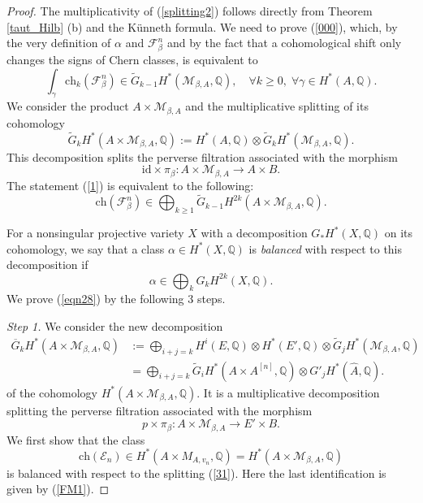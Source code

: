 \documentclass[11pt]{amsart}
\newcommand{\cb}{\color{blue}}
\theoremstyle{plain}
\theoremstyle{definition}
\theoremstyle{remark}
\newcommand{\BQ}{{\mathbb{Q}}}
\newcommand{\CE}{{\mathcal E}}
\newcommand{\CF}{{\mathcal F}}
\newcommand{\CM}{{\mathcal M}}
\begin{document}
\begin{proof}
The multiplicativity of (\ref{splitting2}) follows directly from Theorem \ref{taut_Hilb} (b) and the K\"unneth
formula. We need to prove (\ref{000}), which,  { by the very definition of $\alpha$ and $\CF^n_\beta$ and by the fact that 
a cohomological shift only changes the signs of Chern classes},
 is  equivalent to 
\begin{equation}\label{1}
\int_\gamma \mathrm{ch}_k(\CF^n_\beta) \in \widetilde{G}_{k-1} H^\ast(\CM_{\beta,A}, \BQ),\quad 
\forall k\geq 0, \; \forall \gamma \in H^\ast(A, \BQ).
\end{equation}
We consider the  product  $A \times \CM_{\beta,A}$ and the multiplicative splitting 
of its cohomology
\begin{equation}\label{eqn27}
\widetilde{G}_kH^\ast(A \times \CM_{\beta,A} ,\BQ) := H^\ast(A, \BQ) \otimes \widetilde{G}_kH^\ast(\CM_{\beta,A}, \BQ).
\end{equation} This decomposition splits the perverse filtration associated with the morphism
\[
\mathrm{id}\times \pi_\beta: A \times \CM_{\beta, A} \to A \times B.
\]
The statement (\ref{1}) is equivalent to the following:
\begin{equation}\label{eqn28}
\mathrm{ch}(\CF^n_\beta) \in \bigoplus_{k\geq 1} \widetilde{G}_{k-1} H^{2k}(A\times \CM_{\beta, A}, \BQ).
\end{equation}

For a nonsingular projective variety $X$ with a decomposition $G_*H^*(X, \BQ)$ on its cohomology, we say that a class $\alpha \in H^*(X, \BQ)$ is \emph{balanced} with respect to this decomposition if 
\[
\alpha \in \bigoplus_{k} G_{k} H^{2k}(X, \BQ).
\]
We prove (\ref{eqn28}) by the following 3 steps.

\noindent\emph{Step 1.} We consider the new decomposition 
\begin{equation}\label{31}
\begin{split}
\overline{G}_k H^*(A \times \CM_{\beta, A}, \BQ)& := \bigoplus_{i+j=k} H^i(E, \BQ) \otimes H^*(E', \BQ) \otimes \widetilde{G}_jH^*(\CM_{\beta,A}, \BQ)\\
& = \bigoplus_{i+j=k} \widetilde{G}_i H^\ast(A \times A^{[n]}, \BQ) \otimes G'_jH^\ast(\hat{A}, \BQ).
\end{split}
\end{equation}
of the cohomology $H^\ast(A\times \CM_{\beta,A}, \BQ)$. It is a multiplicative decomposition splitting the perverse filtration associated with the morphism
\[
p \times \pi_\beta: A\times \CM_{\beta,A} \to E' \times B.
\]
We first show that the class
\[
\mathrm{ch}(\CE_n) \in H^\ast(A \times M_{A, v_n}, \BQ) = H^*(A \times \CM_{\beta,A}, \BQ)
\]
is balanced with respect to the splitting (\ref{31}). Here the last identification is given by (\ref{FM1}).



\end{proof}
\end{document}
